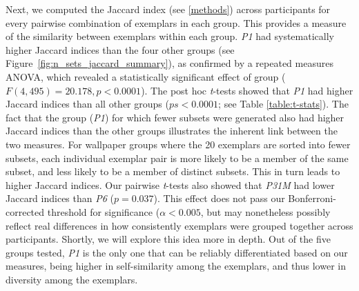 \documentclass[symmetry,article,accept,pdftex,moreauthors]{Definitions/mdpi}
\begin{document}
Next, we computed the Jaccard index (see \ref{methods}) across participants for every pairwise combination of exemplars in each group. This provides a measure of the similarity between exemplars within each group. \textit{P1} had systematically higher Jaccard indices than the four other groups (see \mbox{Figure \ref{fig:n_sets_jaccard_summary}}), as confirmed by a repeated measures ANOVA, which revealed a statistically significant effect of group ($F(4, 495)=20.178, p < 0.0001$). The post hoc \textit{t}-tests showed that \textit{P1} had higher Jaccard indices than all other groups ($ps < 0.0001$; see Table \ref{table:t-stats}). The fact that the group (\textit{P1}) for which fewer subsets were generated also had higher Jaccard indices than the other groups illustrates the inherent link between the two measures. For wallpaper groups where the 20 exemplars are sorted into fewer subsets, each individual exemplar pair is more likely to be a member of the same subset, and less likely to be a member of distinct subsets. This in turn leads to higher Jaccard indices. Our pairwise \textit{t}-tests also showed that \textit{P31M} had lower Jaccard indices than \textit{P6} ($p = 0.037$). This effect does not pass our Bonferroni-corrected threshold for significance ($\alpha < 0.005$, but may nonetheless possibly reflect real differences in how consistently exemplars were grouped together across participants. Shortly, we will explore this idea more in depth. Out of the five groups tested, \textit{P1} is the only one that can be reliably differentiated based on our measures, being higher in self-similarity among the exemplars, and thus lower in diversity among the exemplars. 
\end{document}
